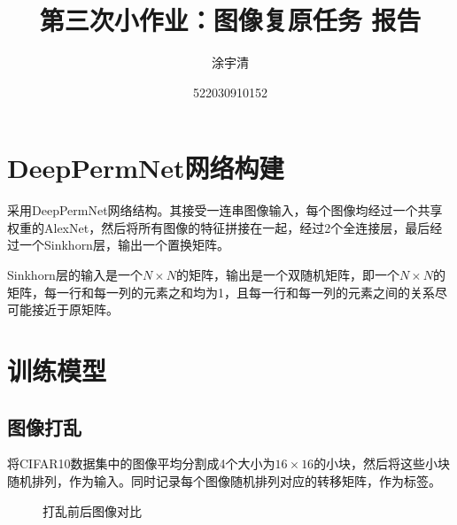\documentclass[UTF8,a4paper,12pt]{ctexart}
\title{\textbf{\Large{第三次小作业：图像复原任务 报告}}}
\author{涂宇清}
\date{522030910152}
\begin{document}
 
\maketitle
\setcounter{page}{1}        %
 
 
\section{DeepPermNet网络构建}
采用DeepPermNet网络结构。其接受一连串图像输入，每个图像均经过一个共享权重的AlexNet，然后将所有图像的特征拼接在一起，经过2个全连接层，最后经过一个Sinkhorn层，输出一个置换矩阵。

Sinkhorn层的输入是一个$N \times N$的矩阵，输出是一个双随机矩阵，即一个$N \times N$的矩阵，每一行和每一列的元素之和均为1，且每一行和每一列的元素之间的关系尽可能接近于原矩阵。

\section{训练模型}

\subsection{图像打乱}

将CIFAR10数据集中的图像平均分割成4个大小为$16\times16$的小块，然后将这些小块随机排列，作为输入。同时记录每个图像随机排列对应的转移矩阵，作为标签。

\begin{figure}[H]
    \centering
    \caption{打乱前后图像对比}
\end{figure}
\end{document}
